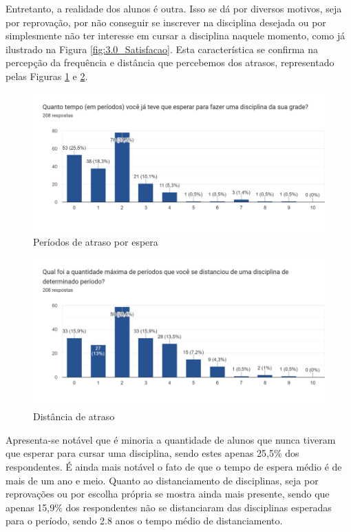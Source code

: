Entretanto, a realidade dos alunos é outra. Isso se dá por diversos motivos, seja por reprovação, por não conseguir se inscrever na disciplina desejada ou por simplesmente não ter interesse em cursar a disciplina naquele momento, como já ilustrado na Figura \ref{fig:3.0_Satisfacao}. Esta característica se confirma na percepção da frequência e distância que percebemos dos atrasos, representado pelas Figuras \ref{fig:5.1-Atrasos-Esperar} e \ref{fig:5.2-Atrasos-Distancia}.

\begin{figure}[htbp]\centering
  \caption{\label{fig:5.1-Atrasos-Esperar}Períodos de atraso por espera}
  \includegraphics[scale=0.6]{files/img/Forms/5.1-Atrasos-Esperar.png}
\end{figure} %
\begin{figure}[htbp]\centering
  \caption{\label{fig:5.2-Atrasos-Distancia}Distância de atraso}
  \includegraphics[scale=0.6]{files/img/Forms/5.2-Atrasos-Distancia.png}
\end{figure} %
Apresenta-se notável que é minoria a quantidade de alunos que nunca tiveram que esperar para cursar uma disciplina, sendo estes apenas 25,5\% dos respondentes. É ainda mais notável o fato de que o tempo de espera médio é de mais de um ano e meio. Quanto ao distanciamento de disciplinas, seja por reprovações ou por escolha própria se mostra ainda mais presente, sendo que apenas 15,9\% dos respondentes não se distanciaram das disciplinas esperadas para o período, sendo 2.8 anos o tempo médio de distanciamento.

